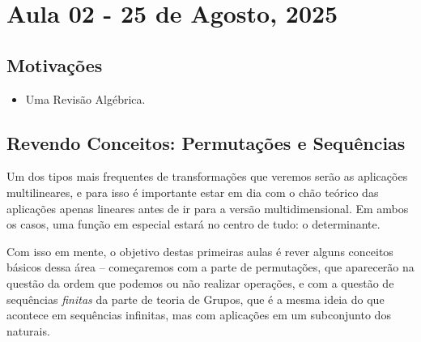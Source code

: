 \documentclass[../differential_forms.tex]{subfiles}
\begin{document}
\section{Aula 02 - 25 de Agosto, 2025}
\subsection{Motivações}
\begin{itemize}
	\item Uma Revisão Algébrica.
\end{itemize}
\subsection{Revendo Conceitos: Permutações e Sequências}
Um dos tipos mais frequentes de transformações que veremos serão as aplicações multilineares, e para isso é importante estar em dia com o chão teórico das aplicações apenas lineares antes de ir para a versão multidimensional. Em ambos os casos, uma função em especial estará no centro de tudo: o determinante.

Com isso em mente, o objetivo destas primeiras aulas é rever alguns conceitos básicos dessa área -- começaremos com a parte de permutações, que aparecerão na questão da ordem que podemos ou não realizar operações, e com a questão de sequências \textit{finitas} da parte de teoria de Grupos, que é a mesma ideia do que acontece em sequências infinitas, mas com aplicações em um subconjunto dos naturais.
\end{document}
